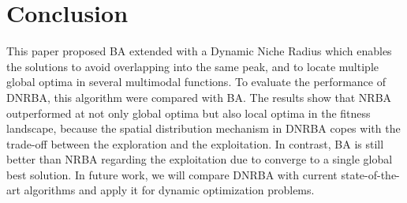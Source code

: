 \section{Conclusion}
This paper proposed BA extended with a Dynamic Niche Radius which enables the solutions to avoid overlapping  into the same peak, and to locate multiple global optima in several multimodal functions. To evaluate the performance of DNRBA, this algorithm were compared with BA. The results show that NRBA outperformed at not only global optima but also local optima in the fitness landscape, because the spatial distribution mechanism in DNRBA copes with the trade-off between the exploration and the exploitation. In contrast, BA is still better than NRBA regarding the exploitation due to converge to a single global best solution. In future work, we will compare DNRBA with current state-of-the-art algorithms and apply it for dynamic optimization problems.




